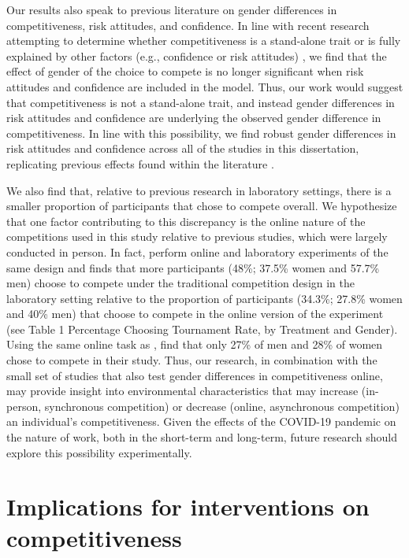 \documentclass[a4paper, nobind]{templates/ociamthesis}
\begin{document}
Our results also speak to previous literature on gender differences in competitiveness, risk attitudes, and confidence. In line with recent research attempting to determine whether competitiveness is a stand-alone trait or is fully explained by other factors (e.g., confidence or risk attitudes) \autocite{Gillen2019,Veldhuizen2017}, we find that the effect of gender of the choice to compete is no longer significant when risk attitudes and confidence are included in the model. Thus, our work would suggest that competitiveness is not a stand-alone trait, and instead gender differences in risk attitudes and confidence are underlying the observed gender difference in competitiveness. In line with this possibility, we find robust gender differences in risk attitudes and confidence across all of the studies in this dissertation, replicating previous effects found within the literature \autocite{Croson2009,Dohmen2011b,Eckel2008,Bertrand2010a,Bertrand2010,Lundeberg1994,Mobius2011,Barber2001}.

We also find that, relative to previous research in laboratory settings, there is a smaller proportion of participants that chose to compete overall. We hypothesize that one factor contributing to this discrepancy is the online nature of the competitions used in this study relative to previous studies, which were largely conducted in person. In fact, \textcite{Apicella2017a} perform online and laboratory experiments of the same design and finds that more participants (48\%; 37.5\% women and 57.7\% men) choose to compete under the traditional competition design in the laboratory setting relative to the proportion of participants (34.3\%; 27.8\% women and 40\% men) that choose to compete in the online version of the experiment (see Table 1 Percentage Choosing Tournament Rate, by Treatment and Gender). Using the same online task as \textcite{Apicella2017a}, \textcite{Charness2021} find that only 27\% of men and 28\% of women chose to compete in their study. Thus, our research, in combination with the small set of studies that also test gender differences in competitiveness online, may provide insight into environmental characteristics that may increase (in-person, synchronous competition) or decrease (online, asynchronous competition) an individual's competitiveness. Given the effects of the COVID-19 pandemic on the nature of work, both in the short-term and long-term, future research should explore this possibility experimentally.

\hypertarget{implications-for-interventions-on-competitiveness}{%
\section{Implications for interventions on competitiveness}\label{implications-for-interventions-on-competitiveness}}
\end{document}

